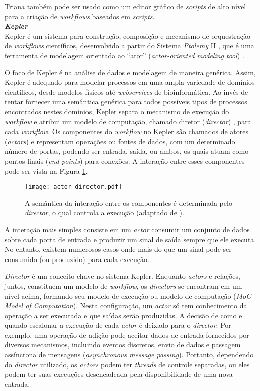 Triana também pode ser usado como um editor gráfico de \textit{scripts} de alto nível para a criação de \textit{workflows} baseados em \textit{scripts}.\\

\noindent
\textbf{\textit{Kepler}} \\

\noindent
Kepler é um sistema para construção, composição e mecanismo de orquestração de \textit{workflows} científicos, desenvolvido a partir do Sistema \textit{Ptolemy} II \cite{ptolemy}, que é uma ferramenta de modelagem orientada ao ``ator'' (\textit{actor-oriented modeling tool}) \cite{can_one_size_fit_all}. 

O foco de Kepler é na análise de dados e modelagem de maneira genérica. Assim, Kepler é adequado para modelar processos em uma ampla variedade de domínios científicos, desde modelos físicos até \textit{webservices} de bioinformática. Ao invés de tentar fornecer uma semântica genérica para todos possíveis tipos de processos encontrados nestes domínios, Kepler separa o mecanismo de execução do \textit{workflow} e atribui um modelo de computação, chamado diretor (\textit{director}) \cite{kepler_system}, para cada \textit{workflow}. Os componentes do \textit{workflow} no Kepler são chamados de atores (\textit{actors}) e representam operações ou fontes de dados, com um determinado número de portas, podendo ser entrada, saída, ou ambos, os quais atuam como pontos finais (\textit{end-points}) para conexões. A interação entre esses componentes pode ser vista na Figura \ref{fig:actor_director}.

\begin{figure}[ht]
	\centering
	\texttt{[image: actor\_director.pdf]}
	\caption{A semântica da interação entre os componentes é determinada pelo \textit{director}, o qual controla a execução (adaptado de \cite{kepler_system}).}
	\label{fig:actor_director}
\end{figure}

A interação mais simples consiste em um \textit{actor} consumir um conjunto de dados sobre cada porta de entrada e produzir um sinal de saída sempre que ele executa. No entanto, existem numerosos casos onde mais do que um sinal pode ser consumido (ou produzido) para cada execução.

\textit{Director} é um conceito-chave no sistema Kepler. Enquanto \textit{actors} e relações, juntos, constituem um modelo de \textit{workflow}, os \textit{directors} se encontram em um nível acima, formando seu modelo de execução ou modelo de computação (\textit{MoC - Model of Computation}). Nesta configuração, um \textit{actor} só tem conhecimento da operação a ser executada e que saídas serão produzidas. A decisão de como e quando escalonar a execução de cada \textit{actor} é deixado para o \textit{director}. Por exemplo, uma operação de adição pode aceitar dados de entrada fornecidos por diversos mecanismos, incluindo eventos discretos, envio de dados e passagem assíncrona de mensagens (\textit{asynchronous message passing}). Portanto, dependendo do \textit{director} utilizado, os \textit{actors} podem ter \textit{threads} de controle separadas, ou eles podem ter suas execuções desencadeada pela disponibilidade de uma nova entrada.


